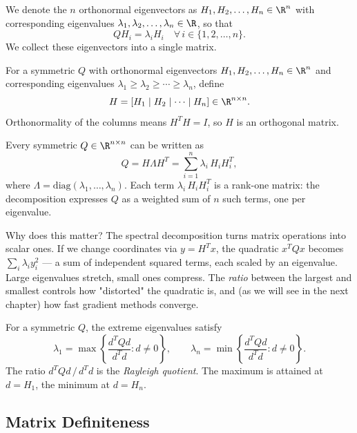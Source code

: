 We denote the $n$ orthonormal eigenvectors as $H_1, H_2, \dots, H_n \in \R^n$ with corresponding eigenvalues $\lambda_1, \lambda_2, \dots, \lambda_n \in \R$, so that
$$
  Q H_i = \lambda_i H_i \quad \forall\, i \in \{1, 2, \dots, n\}.
$$
We collect these eigenvectors into a single matrix.

\begin{defn}\label{def:eigvec-matrix}
  For a symmetric $Q$ with orthonormal eigenvectors $H_1, H_2, \dots, H_n \in \R^n$ and corresponding eigenvalues $\lambda_1 \geq \lambda_2 \geq \cdots \geq \lambda_n$, define
  $$
    H = [H_1 \mid H_2 \mid \cdots \mid H_n] \in \R^{n \times n}.
  $$
  Orthonormality of the columns means $H^T H = I$, so $H$ is an orthogonal matrix.
\end{defn}

\begin{thm}\label{thm:spectral}
  Every symmetric $Q \in \R^{n \times n}$ can be written as
  $$
    Q = H \Lambda H^T = \sum_{i=1}^{n} \lambda_i\, H_i H_i^T,
  $$
  where $\Lambda = \mathrm{diag}(\lambda_1, \dots, \lambda_n)$.
  Each term $\lambda_i\, H_i H_i^T$ is a rank-one matrix: the decomposition expresses $Q$ as a weighted sum of $n$ such terms, one per eigenvalue.
\end{thm}

Why does this matter?
The spectral decomposition turns matrix operations into scalar ones.
If we change coordinates via $y = H^T x$, the quadratic $x^T Q x$ becomes $\sum_i \lambda_i y_i^2$ — a sum of independent squared terms, each scaled by an eigenvalue.
Large eigenvalues stretch, small ones compress.
The \emph{ratio} between the largest and smallest controls how "distorted" the quadratic is, and (as we will see in the next chapter) how fast gradient methods converge.

\begin{thm}\label{thm:var-eigen}
  For a symmetric $Q$, the extreme eigenvalues satisfy
  $$
    \lambda_1 = \max\left\{\frac{d^T Q d}{d^T d} : d \neq 0\right\},
    \qquad
    \lambda_n = \min\left\{\frac{d^T Q d}{d^T d} : d \neq 0\right\}.
  $$
  The ratio $d^T Q d \,/\, d^T d$ is the \textit{Rayleigh quotient}.
  The maximum is attained at $d = H_1$, the minimum at $d = H_n$.
\end{thm}


\subsection{Matrix Definiteness}

